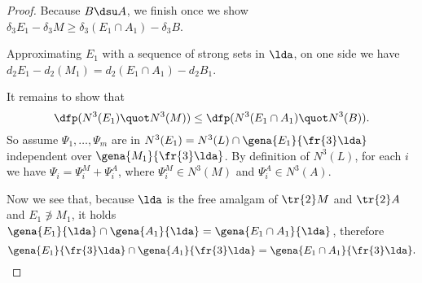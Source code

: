 \begin{proof}

Because
$B\dsu A$, %
we finish once we show
$\delta_{3}E_{1}-\delta_{3}M\geq\delta_{3}(E_{1}\cap A_{1})-\delta_{3}B$.

Approximating $E_{1}$ with a sequence of strong sets in $\lda$, on one side we have
$d_{2}E_{1}-d_{2}(M_{1})=d_{2}(E_{1}\cap A_{1})-d_{2}B_{1}$.

It remains to show that
$$\dfp(N^{3}(E_{1})\quot N^{3}(M))\leq\dfp(N^{3}(E_{1}\cap A_{1})\quot N^{3}(B)).$$
So assume $\Psi_{1},\dots,\Psi_{m}$ are in $N^{3}(E_{1})=N^{3}(L)\cap\gena{E_{1}}{\fr{3}\lda}$ independent
over $\gena{M_{1}}{\fr{3}\lda}$. By definition of $N^{3}(L)$, for each $i$ we have
$\Psi_{i}=\Psi_{i}^{M}+\Psi_{i}^{A}$, where $\Psi_{i}^{M}\in N^{3}(M)$ and $\Psi_{i}^{A}\in N^{3}(A)$.

Now we see that, because $\lda$ is the free amalgam of $\tr{2}M$ and $\tr{2}A$ and $E_{1}\nni M_{1}$,
it holds $\gena{E_{1}}{\lda}\cap\gena{A_{1}}{\lda}=\gena{E_{1}\cap A_{1}}{\lda}$,
therefore $$\gena{E_{1}}{\fr{3}\lda}\cap\gena{A_{1}}{\fr{3}\lda}=\gena{E_{1}\cap A_{1}}{\fr{3}\lda}.$$


\end{proof}
